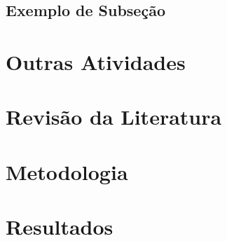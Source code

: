\documentclass[11pt, a4paper]{article}
\theoremstyle{definition}
\numberwithin{equation}{section}
\begin{document}
\subsection{Exemplo de Subseção}

\lipsum[1]

\section{Outras Atividades}

\lipsum[1]

\section{Revisão da Literatura}

\lipsum[1]

\section{Metodologia}

\lipsum[1]

\section{Resultados}

\lipsum[1]








\newpage


\end{document}
